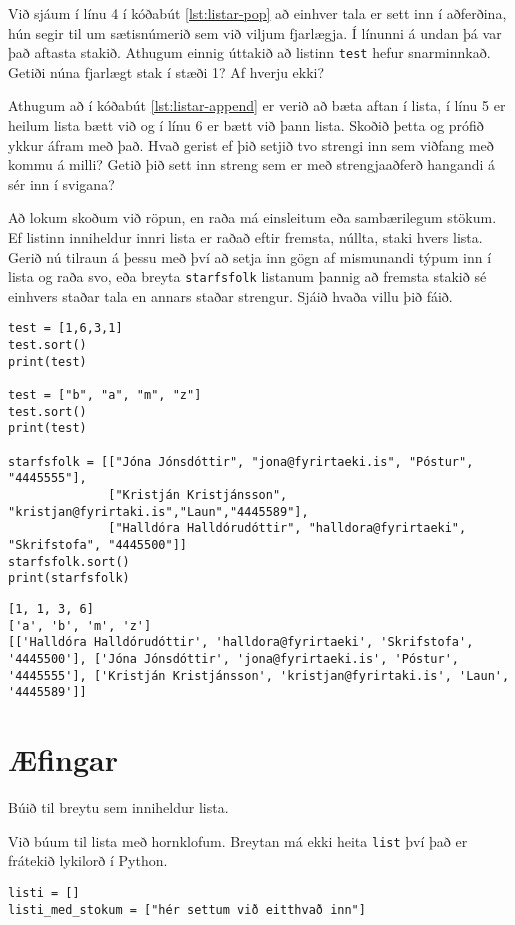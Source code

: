 Við sjáum í línu 4 í kóðabút \ref{lst:listar-pop} að einhver tala er sett inn í aðferðina, hún segir til um sætisnúmerið sem við viljum fjarlægja.
Í línunni á undan þá var það aftasta stakið.
Athugum einnig úttakið að listinn \texttt{test} hefur snarminnkað.
Getiði núna fjarlægt stak í stæði 1?
Af hverju ekki?

Athugum að í kóðabút \ref{lst:listar-append} er verið að bæta aftan í lista, í línu 5 er heilum lista bætt við og í línu 6 er bætt við þann lista.
Skoðið þetta og prófið ykkur áfram með það.
Hvað gerist ef þið setjið tvo strengi inn sem viðfang með kommu á milli?
Getið þið sett inn streng sem er með strengjaaðferð hangandi á sér inn í svigana?

Að lokum skoðum við röpun, en raða má einsleitum eða sambærilegum stökum.
Ef listinn inniheldur innri lista er raðað eftir fremsta, núllta, staki hvers lista.
Gerið nú tilraun á þessu með því að setja inn gögn af mismunandi týpum inn í lista og raða svo, eða breyta \texttt{starfsfolk} listanum þannig að fremsta stakið sé einhvers staðar tala en annars staðar strengur.
Sjáið hvaða villu þið fáið.

\begin{lstlisting}[caption=.sort() aðferðin, label=lst:listar-sort]
test = [1,6,3,1]
test.sort()
print(test)

test = ["b", "a", "m", "z"]
test.sort()
print(test)

starfsfolk = [["Jóna Jónsdóttir", "jona@fyrirtaeki.is", "Póstur", "4445555"],
			  ["Kristján Kristjánsson", "kristjan@fyrirtaki.is","Laun","4445589"],
			  ["Halldóra Halldórudóttir", "halldora@fyrirtaeki", "Skrifstofa", "4445500"]]
starfsfolk.sort()
print(starfsfolk)
\end{lstlisting}
\lstset{style=uttak}
\begin{lstlisting}
[1, 1, 3, 6]
['a', 'b', 'm', 'z']
[['Halldóra Halldórudóttir', 'halldora@fyrirtaeki', 'Skrifstofa', '4445500'], ['Jóna Jónsdóttir', 'jona@fyrirtaeki.is', 'Póstur', '4445555'], ['Kristján Kristjánsson', 'kristjan@fyrirtaki.is', 'Laun', '4445589']]
\end{lstlisting}
\lstset{style=venjulegt}



\newpage
\section{Æfingar}
\begin{exercise}\label{lst1}
	Búið til breytu sem inniheldur lista.
\end{exercise}
\begin{Answer}[ref={lst1}]
Við búum til lista með hornklofum.
Breytan má ekki heita \texttt{list} því það er frátekið lykilorð í Python.
\begin{lstlisting}
listi = []
listi_med_stokum = ["hér settum við eitthvað inn"]\end{lstlisting}
\end{Answer}

